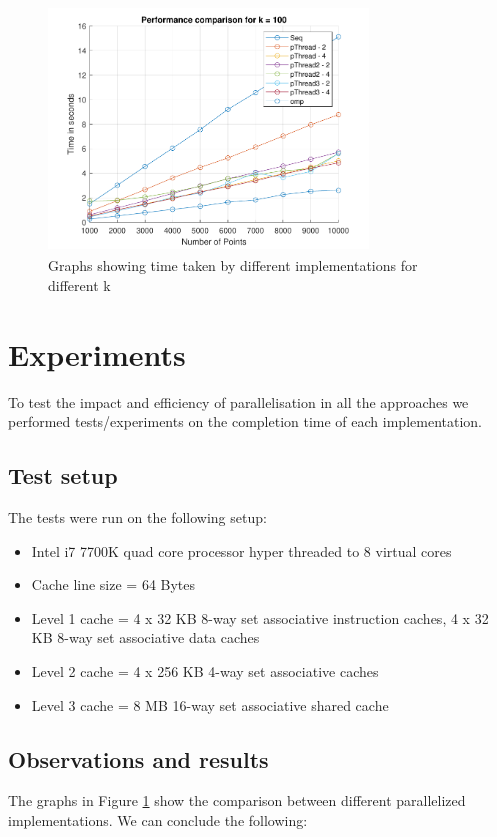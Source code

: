 \documentclass[a4paper, 11pt]{article}
\begin{document}
\begin{figure}[H]
    \includegraphics[width=8.5cm,height=6.5cm]{k100}
    \caption{Graphs showing time taken by different implementations for different k}
    \label{fig:my_label}
\end{figure}

\newpage
\section{Experiments}

To test the impact and efficiency of parallelisation in all the approaches we performed tests/experiments on the completion time of each implementation.

\subsection{Test setup}
The tests were run on the following setup:
\begin{itemize}
    \item Intel i7 7700K quad core processor hyper threaded to 8 virtual cores
    \item Cache line size = 64 Bytes
    \item Level 1 cache = 4 x 32 KB 8-way set associative instruction caches, 4 x 32 KB 8-way set associative data caches
    \item Level 2 cache = 4 x 256 KB 4-way set associative caches
    \item Level 3 cache = 8 MB 16-way set associative shared cache
\end{itemize}

\subsection{Observations and results}

The graphs in Figure \ref{fig:my_label} show the comparison between different parallelized implementations. We can conclude the following:
\end{document}
